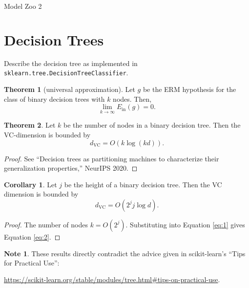 \documentclass[10pt]{exam}
\theoremstyle{definition}
\newtheorem{corollary}{Corollary}
\newtheorem{note}{Note}
\newtheorem{fact}{Fact}
\newtheorem{theorem}{Theorem}
\newcommand{\Ein}{E_{\text{in}}}
\newcommand{\dvc}{{d_{\text{VC}}}}
\begin{document}
\begin{center}
{
\Huge
Model Zoo 2
}
\end{center}

\section*{Decision Trees}

Describe the decision tree as implemented in \lstinline{sklearn.tree.DecisionTreeClassifier}.

\newpage

\begin{theorem}[universal approximation]
    Let $g$ be the ERM hypothesis for the class of binary decision trees with $k$ nodes.
    Then,
    \begin{equation}
        \lim_{k\to\infty} \Ein(g) = 0
        .
    \end{equation}
\end{theorem}

\begin{theorem}
    Let $k$ be the number of nodes in a binary decision tree.
    Then the VC-dimension is bounded by
    \begin{equation}
        \dvc = O(k\log(kd)).
        \label{eq:1}
    \end{equation}
\end{theorem}
\begin{proof}
    See ``Decision trees as partitioning machines to characterize their generalization properties,'' NeurIPS 2020.
\end{proof}
\begin{corollary}
    Let $j$ be the height of a binary decision tree.
    Then the VC dimension is bounded by
    \begin{equation}
        \dvc = O(2^j j \log d).
        \label{eq:2}
    \end{equation}
\end{corollary}
\begin{proof}
    The number of nodes $k=O(2^j)$.
    Substituting into Equation \eqref{eq:1} gives Equation \eqref{eq:2}.
\end{proof}

\begin{note}
    These results directly contradict the advice given in scikit-learn's ``Tips for Practical Use'':
    
    \url{https://scikit-learn.org/stable/modules/tree.html#tips-on-practical-use}.
\end{note}
\end{document}
